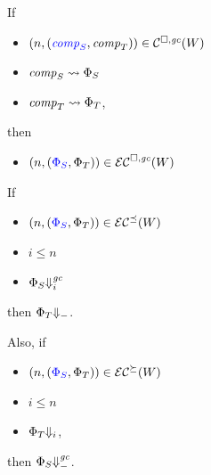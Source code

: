 \documentclass[a4paper]{article}
\begin{document}
\begin{lemma}
  If
  \begin{itemize}
  \item $\npair{\stpair{\var{comp}}{\var{comp}}} \in \lrcomp(W)$
  \item $\var{comp}_S\rightsquigarrow \Phi_S$
  \item $\var{comp}_T \rightsquigarrow \Phi_T$,
  \end{itemize}
  then
  \begin{itemize}
  \item $\npair{\stpair{\Phi}{\Phi}}\in\lrec(W)$
  \end{itemize}
\end{lemma}

\begin{lemma}
  If
  \begin{itemize}
  \item $\npair{\stpair{\Phi}{\Phi}}\in\lrec[\preceq](W)$
  \item $i \leq n$
  \item $\Phi_S \sterm[i]{\gc}$
  \end{itemize}
  then $\Phi_T\term$.

  Also, if
  \begin{itemize}
  \item $\npair{\stpair{\Phi}{\Phi}}\in\lrec[\succeq](W)$
  \item $i \leq n$
  \item $\Phi_T \term[i]$,
  \end{itemize}
  then $\Phi_S\sterm{\gc}$.
\end{lemma}
\end{document}
